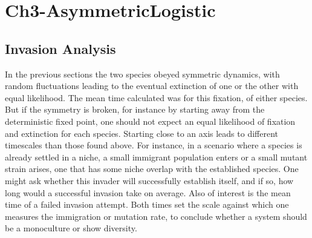 \chapter{Ch3-AsymmetricLogistic}

\section{Invasion Analysis}

In the previous sections the two species obeyed symmetric dynamics, with random fluctuations leading to the eventual extinction of one or the other with equal likelihood. 
The mean time calculated was for this fixation, of either species. 
But if the symmetry is broken, for instance by starting away from the deterministic fixed point, one should not expect an equal likelihood of fixation and extinction for each species. 
Starting close to an axis leads to different timescales than those found above. %
For instance, in a scenario where a species is already settled in a niche, a small immigrant population enters or a small mutant strain arises, one that has some niche overlap with the established species. 
One might ask whether this invader will successfully establish itself, and if so, how long would a successful invasion take on average. 
Also of interest is the mean time of a failed invasion attempt. 
Both times set the scale against which one measures the immigration or mutation rate, to conclude whether a system should be a monoculture or show diversity. 
